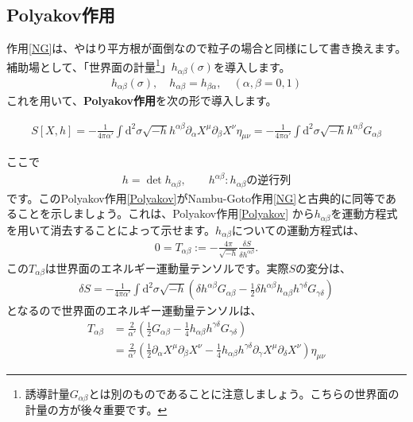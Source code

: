 \documentclass[report,paper=a4, fontsize=12pt, line_length=16cm, number_of_lines=34,dvipdfmx]{jlreq}
\newenvironment{important}{\begin{tcolorbox}[
  colback = white,
  colframe = red!35,
  boxrule = 2mm,
  fonttitle = \bfseries,
  after = \noindent] }{\end{tcolorbox}}
\numberwithin{equation}{chapter}
\numberwithin{equation}{section}
\newcommand{\del}{\partial}
\newcommand{\kyou}[1]{{\sffamily \bfseries #1}}
\newcommand{\di}{\mathrm{d}}
\begin{document}
\subsection{Polyakov作用}
作用\eqref{NG}は、やはり平方根が面倒なので粒子の場合と同様にして書き換えます。
補助場として、「世界面の計量\footnote{誘導計量$G_{\alpha\beta}$とは別のものであることに注意しましょう。こちらの世界面の計量の方が後々重要です。}」$h_{\alpha\beta}(\sigma)$を導入します。
\begin{align}
h_{\alpha\beta}(\sigma),\quad
h_{\alpha\beta}=h_{\beta\alpha},\quad
(\alpha,\beta=0,1)
\end{align}
これを用いて、\kyou{Polyakov作用}を次の形で導入します。
\begin{important}
  \begin{align}
    S[X,h]=-\frac{1}{4\pi\alpha'}\int \di^2\sigma \sqrt{-h}h^{\alpha\beta}\del_{\alpha}X^{\mu}\del_{\beta}X^{\nu}\eta_{\mu\nu}=
    -\frac{1}{4\pi\alpha'}\int \di^2\sigma \sqrt{-h}h^{\alpha\beta}G_{\alpha\beta}
    \label{Polyakov}
    \end{align}      
\end{important}
ここで
\begin{align}
h=\det h_{\alpha\beta},\qquad h^{\alpha\beta} : h_{\alpha\beta}\text{の逆行列}
\end{align}
です。このPolyakov作用\eqref{Polyakov}がNambu-Goto作用\eqref{NG}と古典的に同等であることを示しましょう。これは、Polyakov作用\eqref{Polyakov}
から$h_{\alpha\beta}$を運動方程式を用いて消去することによって示せます。$h_{\alpha\beta}$についての運動方程式は、
\begin{align}
0=T_{\alpha\beta}:=-\frac{4\pi}{\sqrt{-h}}\frac{\delta S}{\delta h^{\alpha\beta}}. \label{constraintT}
\end{align}
この$T_{\alpha\beta}$は世界面のエネルギー運動量テンソルです。実際$S$の変分は、
\begin{align}
\delta S=-\frac{1}{4\pi\alpha'}\int \di^2\sigma \sqrt{-h}\left(\delta h^{\alpha\beta}G_{\alpha\beta}-\frac12 \delta h^{\alpha\beta} h_{\alpha\beta}
h^{\gamma\delta}G_{\gamma\delta}
\right)
\end{align}
となるので世界面のエネルギー運動量テンソルは、
\begin{align}
 T_{\alpha\beta}&=\frac{2}{\alpha'}\left(\frac12 G_{\alpha\beta}-\frac14 h_{\alpha\beta}h^{\gamma\delta}G_{\gamma\delta}\right)\nonumber\\
 &=\frac{2}{\alpha'}\left(\frac12 \del_{\alpha}X^{\mu}\del_{\beta}X^{\nu} - \frac14 h_{\alpha\beta}h^{\gamma\delta}\del_{\gamma} X^{\mu}\del_{\delta}X^{\nu}\right)\eta_{\mu\nu}
 \label{EM}
\end{align}
\end{document}
